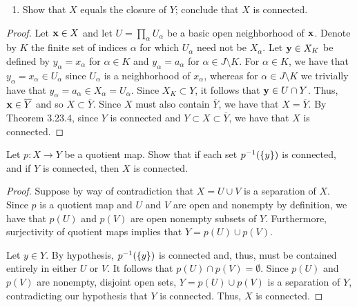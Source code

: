 \begin{solution}
  \begin{enumerate}[label={(\alph*)}, align=left, leftmargin=\parindent, listparindent=\parindent, labelwidth=0pt, itemindent=!]
    \addtocounter{enumi}{2} 
    \item
      Show that $X$ equals the closure of $Y$;
      conclude that $X$ is connected.
  \end{enumerate}
  \begin{proof}
    Let $\mathbf{x} \in X$ and let $U = \prod_\alpha U_\alpha$ be a basic open neighborhood of $\mathbf{x}$.
    Denote by $K$ the finite set of indices $\alpha$ for which $U_\alpha$ need not be $X_\alpha$.
    Let $\mathbf{y} \in X_K$ be defined by $y_\alpha = x_\alpha$ for $\alpha \in K$ and $y_\alpha = a_\alpha$ for $\alpha \in J \setminus K$.
    For $\alpha \in K$, we have that $y_\alpha = x_\alpha \in U_\alpha$ since $U_\alpha$ is a neighborhood of $x_\alpha$, whereas for $\alpha \in J \setminus K$ we trivially have that $y_\alpha = a_\alpha \in X_\alpha = U_\alpha$.
    Since $X_K \subset Y$, it follows that $\mathbf{y} \in U \cap Y$.
    Thus, $\mathbf{x} \in \overline{Y}$ and so $X \subset \overline{Y}$.
    Since $X$ must also contain $\overline{Y}$, we have that $X = \overline{Y}$.
    By Theorem 3.23.4, since $Y$ is connected and $Y \subset X \subset \overline{Y}$, we have that $X$ is connected.
  \end{proof}
\end{solution}
\newpage

\begin{exercise}[ID=3.23.10]
  Let $p: X \rightarrow Y$ be a quotient map.
  Show that if each set $p^{-1}(\{y\})$ is connected, and if $Y$ is connected, then $X$ is connected.
\end{exercise}
%
\begin{solution}
  \begin{proof}
    Suppose by way of contradiction that $X = U \cup V$ is a separation of $X$.
    Since $p$ is a quotient map and $U$ and $V$ are open and nonempty by definition, we have that $p(U)$ and $p(V)$ are open nonempty subsets of $Y$.
    Furthermore, surjectivity of quotient maps implies that $Y = p(U) \cup p(V)$.

    Let $y \in Y$.
    By hypothesis, $p^{-1}(\{y\})$ is connected and, thus, must be contained entirely in either $U$ or $V$.
    It follows that $p(U) \cap p(V) = \emptyset$.
    Since $p(U)$ and $p(V)$ are nonempty, disjoint open sets, $Y = p(U) \cup p(V)$ is a separation of $Y$, contradicting our hypothesis that $Y$ is connected.
    Thus, $X$ is connected.
  \end{proof}
\end{solution}
\newpage

